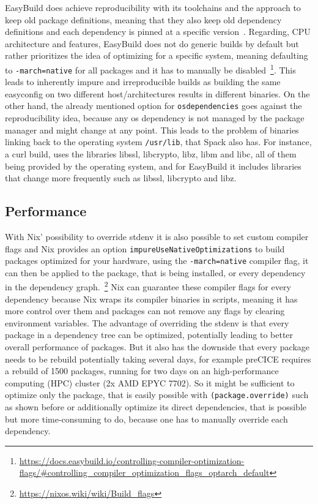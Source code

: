 \documentclass{eceasst}
\begin{document}
EasyBuild does achieve reproducibility with its toolchains and the approach to keep old package definitions, meaning that they also keep old dependency definitions and each dependency is pinned at a specific version~\cite{Geimer_2014}.
Regarding, CPU architecture and features, EasyBuild does not do generic builds by default but rather prioritizes the idea of optimizing for a specific system, meaning defaulting to \texttt{-march=native} for all packages and it has to manually be disabled~\footnote{\url{https://docs.easybuild.io/controlling-compiler-optimization-flags/\#controlling\_compiler\_optimization\_flags\_optarch\_default}}.
This leads to inherently impure and irreproducible builds as building the same easyconfig on two different host/architectures results in different binaries.
On the other hand, the already mentioned option for \texttt{osdependencies} goes against the reproducibility idea, because any os dependency is not managed by the package manager and might change at any point.
This leads to the problem of binaries linking back to the operating system \texttt{/usr/lib}, that Spack also has.
For instance, a curl build, uses the libraries libssl, libcrypto, libz, libm and libc, all of them being provided by the operating system, and for EasyBuild it includes libraries that change more frequently such as libssl, libcrypto and libz.\\

\subsection{Performance}

With Nix' possibility to override stdenv it is also possible to set custom compiler flags and Nix provides an option \texttt{impureUseNativeOptimizations} to build packages optimized for your hardware, using the \texttt{-march=native} compiler flag, it can then be applied to the package, that is being installed, or every dependency in the dependency graph.~\footnote{\url{https://nixos.wiki/wiki/Build_flags}}
Nix can guarantee these compiler flags for every dependency because Nix wraps its compiler binaries in scripts, meaning it has more control over them and packages can not remove any flags by clearing environment variables.
The advantage of overriding the stdenv is that every package in a dependency tree can be optimized, potentially leading to better overall performance of packages.
But it also has the downside that every package needs to be rebuild potentially taking several days, for example preCICE requires a rebuild of 1500 packages, running for two days on an high-performance computing (HPC) cluster (2x AMD EPYC 7702).
So it might be sufficient to optimize only the package, that is easily possible with \texttt{(package.override)} such as shown before or additionally optimize its direct dependencies, that is possible but more time-consuming to do, because one has to manually override each dependency.
\end{document}
